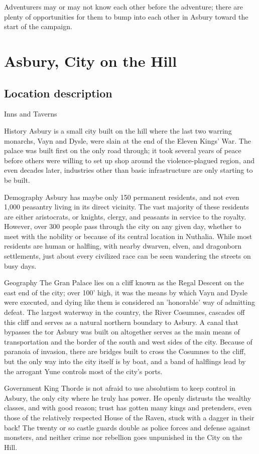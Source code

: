 \documentclass{report}
\theoremstyle{definition}
\begin{document}
Adventurers may or may not know each other before the adventure; there are plenty of opportunities for them to bump into each other in Asbury toward the start of the campaign.

\tableofcontents
\chapter{Asbury, City on the Hill}
\section{Location description}
\begin{labeling}{Inns and Taverns}
\item [History] Asbury is a small city built on the hill where the last two warring monarchs, Vayn and Dysle, were slain at the end of the Eleven Kings' War. The palace was built first on the only road through; it took several years of peace before others were willing to set up shop around the violence-plagued region, and even decades later, industries other than basic infrastructure are only starting to be built.
\item [Demography] Asbury has maybe only 150 permanent residents, and not even 1,000 peasantry living in its direct vicinity.  The vast majority of these residents are either aristocrats, or knights, clergy, and peasants in service to the royalty.  However, over 300 people pass through the city on any given day, whether to meet with the nobility or because of its central location in Nuthalia. While most residents are human or halfling, with nearby dwarven, elven, and dragonborn settlements, just about every civilized race can be seen wandering the streets on busy days.
\item [Geography] The Gran Palace lies on a cliff known as the Regal Descent on the east end of the city; over 100' high, it was the means by which Vayn and Dysle were executed, and dying like them is considered an 'honorable' way of admitting defeat.  The largest waterway in the country, the River Cosumnes, cascades off this cliff and serves as a natural northern boundary to Asbury. A canal that bypasses the tor Asbury was built on altogether serves as the main means of transportation and the border of the south and west sides of the city.  Because of paranoia of invasion, there are bridges built to cross the Cosumnes to the cliff, but the only way into the city itself is by boat, and a band of halflings lead by the arrogant Yune controls most of the city's ports.
\item [Government] King Thorde is not afraid to use absolutism to keep control in Asbury, the only city where he truly has power.  He openly distrusts the wealthy classes, and with good reason; trust has gotten many kings and pretenders, even those of the relatively respected House of the Raven, stuck with a dagger in their back!  The twenty or so castle guards double as police forces and defense against monsters, and neither crime nor rebellion goes unpunished in the City on the Hill.

\end{labeling}
\end{document}
